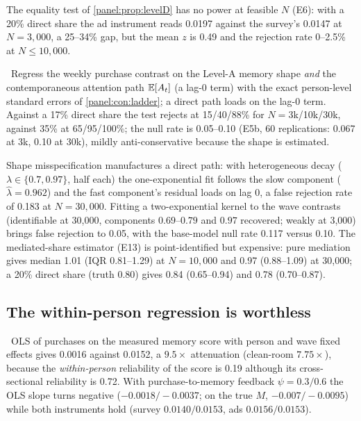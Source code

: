 The equality test of \cref{panel:prop:levelD} has no power at feasible $N$ (E6): with a 20\% direct share the ad instrument reads 0.0197 against the survey's 0.0147 at $N = 3{,}000$, a 25--34\% gap, but the mean $z$ is 0.49 and the rejection rate 0--2.5\% at $N \le 10{,}000$.

\begin{proposition}
\label{panel:prop:shape}
\tagNumerical\ Regress the weekly purchase contrast on the Level-A memory shape \emph{and} the contemporaneous attention path $\mathbb{E}[A_t]$ (a lag-0 term) with the exact person-level standard errors of \cref{panel:con:ladder}; a direct path loads on the lag-0 term. Against a 17\% direct share the test rejects at 15/40/88\% for $N = 3$k/10k/30k, against 35\% at 65/95/100\%; the null rate is 0.05--0.10 (E5b, 60 replications: 0.067 at 3k, 0.10 at 30k), mildly anti-conservative because the shape is estimated.
\end{proposition}

Shape misspecification manufactures a direct path: with heterogeneous decay ($\lambda \in \{0.7, 0.97\}$, half each) the one-exponential fit follows the slow component ($\hat\lambda = 0.962$) and the fast component's residual loads on lag 0, a false rejection rate of 0.183 at $N = 30{,}000$. Fitting a two-exponential kernel to the wave contrasts (identifiable at 30,000, components $0.69$--$0.79$ and $0.97$ recovered; weakly at 3,000) brings false rejection to 0.05, with the base-model null rate 0.117 versus 0.10. The mediated-share estimator (E13) is point-identified but expensive: pure mediation gives median 1.01 (IQR 0.81--1.29) at $N = 10{,}000$ and 0.97 (0.88--1.09) at 30,000; a 20\% direct share (truth 0.80) gives 0.84 (0.65--0.94) and 0.78 (0.70--0.87).

\subsection{The within-person regression is worthless}

\begin{proposition}
\label{panel:prop:ols}
\tagNumerical\ OLS of purchases on the measured memory score with person and wave fixed effects gives 0.0016 against 0.0152, a $9.5\times$ attenuation (clean-room $7.75\times$), because the \emph{within-person} reliability of the score is 0.19 although its cross-sectional reliability is 0.72. With purchase-to-memory feedback $\psi = 0.3/0.6$ the OLS slope turns negative ($-0.0018/-0.0037$; on the true $M$, $-0.007/-0.0095$) while both instruments hold (survey $0.0140/0.0153$, ads $0.0156/0.0153$).
\end{proposition}

